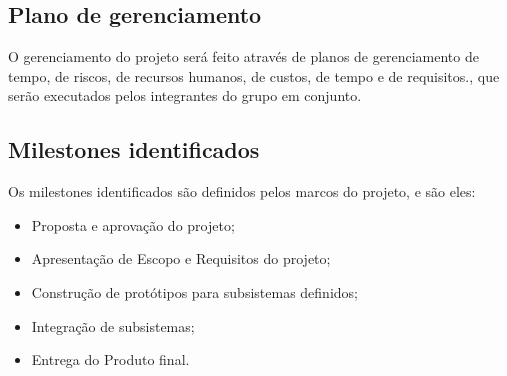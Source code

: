 \begin{apendicesenv}
\subsection{Plano de gerenciamento}
O gerenciamento do projeto será feito através de planos de gerenciamento de tempo, de riscos, de recursos humanos, de custos, de tempo e de requisitos., que serão executados pelos integrantes do grupo em conjunto.

\subsection{Milestones identificados}
Os milestones identificados são definidos pelos marcos do projeto, e são eles:

\begin{itemize}
\item Proposta e aprovação do projeto;
\item Apresentação de Escopo e Requisitos do projeto;
\item Construção de protótipos para subsistemas definidos;
\item Integração de subsistemas;
\item Entrega do Produto final.
\end{itemize}


\end{apendicesenv}
